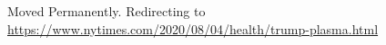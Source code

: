 Moved Permanently. Redirecting to
\url{https://www.nytimes.com/2020/08/04/health/trump-plasma.html}
